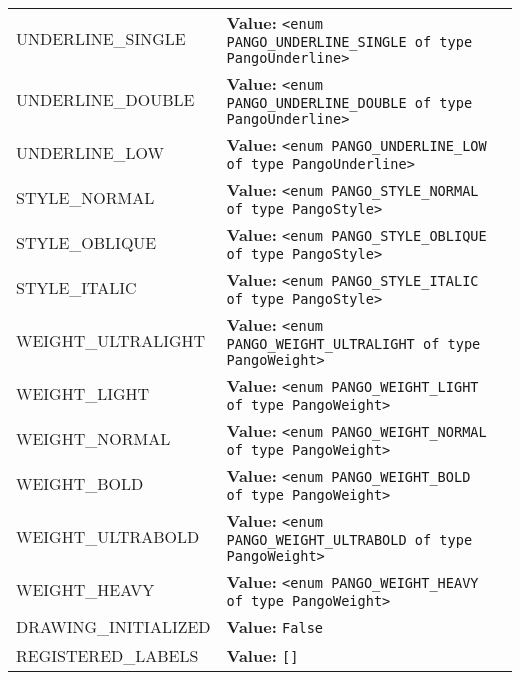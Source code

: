 \begin{longtable}{|p{\varnamewidth}|p{\vardescrwidth}|l}
\cline{1-2}
\raggedright U\-N\-D\-E\-R\-L\-I\-N\-E\-\_\-S\-I\-N\-G\-L\-E\- & \raggedright \textbf{Value:} 
{\tt {\textless}enum PANGO\_UNDERLINE\_SINGLE of type PangoUnderline{\textgreater}}&\\
\cline{1-2}
\raggedright U\-N\-D\-E\-R\-L\-I\-N\-E\-\_\-D\-O\-U\-B\-L\-E\- & \raggedright \textbf{Value:} 
{\tt {\textless}enum PANGO\_UNDERLINE\_DOUBLE of type PangoUnderline{\textgreater}}&\\
\cline{1-2}
\raggedright U\-N\-D\-E\-R\-L\-I\-N\-E\-\_\-L\-O\-W\- & \raggedright \textbf{Value:} 
{\tt {\textless}enum PANGO\_UNDERLINE\_LOW of type PangoUnderline{\textgreater}}&\\
\cline{1-2}
\raggedright S\-T\-Y\-L\-E\-\_\-N\-O\-R\-M\-A\-L\- & \raggedright \textbf{Value:} 
{\tt {\textless}enum PANGO\_STYLE\_NORMAL of type PangoStyle{\textgreater}}&\\
\cline{1-2}
\raggedright S\-T\-Y\-L\-E\-\_\-O\-B\-L\-I\-Q\-U\-E\- & \raggedright \textbf{Value:} 
{\tt {\textless}enum PANGO\_STYLE\_OBLIQUE of type PangoStyle{\textgreater}}&\\
\cline{1-2}
\raggedright S\-T\-Y\-L\-E\-\_\-I\-T\-A\-L\-I\-C\- & \raggedright \textbf{Value:} 
{\tt {\textless}enum PANGO\_STYLE\_ITALIC of type PangoStyle{\textgreater}}&\\
\cline{1-2}
\raggedright W\-E\-I\-G\-H\-T\-\_\-U\-L\-T\-R\-A\-L\-I\-G\-H\-T\- & \raggedright \textbf{Value:} 
{\tt {\textless}enum PANGO\_WEIGHT\_ULTRALIGHT of type PangoWeight{\textgreater}}&\\
\cline{1-2}
\raggedright W\-E\-I\-G\-H\-T\-\_\-L\-I\-G\-H\-T\- & \raggedright \textbf{Value:} 
{\tt {\textless}enum PANGO\_WEIGHT\_LIGHT of type PangoWeight{\textgreater}}&\\
\cline{1-2}
\raggedright W\-E\-I\-G\-H\-T\-\_\-N\-O\-R\-M\-A\-L\- & \raggedright \textbf{Value:} 
{\tt {\textless}enum PANGO\_WEIGHT\_NORMAL of type PangoWeight{\textgreater}}&\\
\cline{1-2}
\raggedright W\-E\-I\-G\-H\-T\-\_\-B\-O\-L\-D\- & \raggedright \textbf{Value:} 
{\tt {\textless}enum PANGO\_WEIGHT\_BOLD of type PangoWeight{\textgreater}}&\\
\cline{1-2}
\raggedright W\-E\-I\-G\-H\-T\-\_\-U\-L\-T\-R\-A\-B\-O\-L\-D\- & \raggedright \textbf{Value:} 
{\tt {\textless}enum PANGO\_WEIGHT\_ULTRABOLD of type PangoWeight{\textgreater}}&\\
\cline{1-2}
\raggedright W\-E\-I\-G\-H\-T\-\_\-H\-E\-A\-V\-Y\- & \raggedright \textbf{Value:} 
{\tt {\textless}enum PANGO\_WEIGHT\_HEAVY of type PangoWeight{\textgreater}}&\\
\cline{1-2}
\raggedright D\-R\-A\-W\-I\-N\-G\-\_\-I\-N\-I\-T\-I\-A\-L\-I\-Z\-E\-D\- & \raggedright \textbf{Value:} 
{\tt False}&\\
\cline{1-2}
\raggedright R\-E\-G\-I\-S\-T\-E\-R\-E\-D\-\_\-L\-A\-B\-E\-L\-S\- & \raggedright \textbf{Value:} 
{\tt \texttt{[}\texttt{]}}&\\
\cline{1-2}
\end{longtable}


